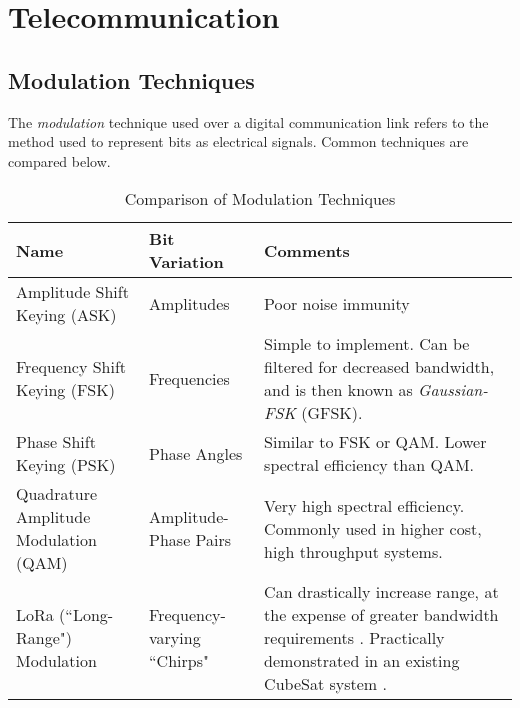 \section{Telecommunication}\label{sec:telecommunication_theory}

\subsection{Modulation Techniques}
The \textit{modulation} technique used over a digital communication link refers to the method used to represent bits as electrical signals. Common techniques are compared below.

\begin{table}[!htb]
  \centering
  \renewcommand{\arraystretch}{1.2}
  \hspace*{-0.5cm}
  \begin{tabular}{ |p{3cm}|p{2cm}|p{11cm}| }
  \hline
  \textbf{Name}                & \textbf{Bit Variation}    & \textbf{Comments} \\ \hline
   Amplitude Shift Keying (ASK)
   & Amplitudes
   & Poor noise immunity
   \\ \hline
   Frequency Shift Keying (FSK)
   & Frequencies
   & Simple to implement. Can be filtered for decreased bandwidth, and is then known as \textit{Gaussian-FSK} (GFSK).
   \\ \hline
   Phase Shift \mbox{Keying} (PSK)
   & Phase \mbox{Angles}
   & Similar to FSK or QAM. Lower spectral efficiency than QAM.
   \\ \hline
   Quadrature Amplitude Modulation (QAM)
   & Amplitude-Phase Pairs
   & Very high spectral efficiency. Commonly used in higher cost, high throughput systems.
   \\ \hline
   LoRa (``Long-Range") Modulation
   & Frequency-varying ``Chirps"
   & Can drastically increase range, at the expense of greater bandwidth requirements \cite{datasheet-SX1278}. Practically demonstrated in an existing CubeSat system \cite{design-FOSSASATLink}.
   \\ \hline
  \end{tabular}
  \caption{Comparison of Modulation Techniques}
  \label{tab:modulationTechniques}
\end{table}
\vspace*{-\baselineskip}

